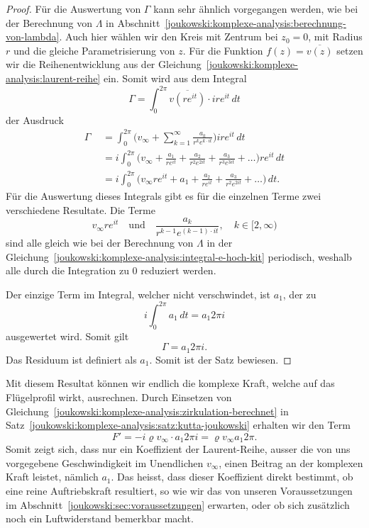 \begin{proof}
	\label{joukowski:komplexe-analysis:proof:zirkulation}
	Für die Auswertung von $\Gamma$ kann sehr ähnlich vorgegangen werden, wie bei der Berechnung von $\Lambda$ in Abschnitt~\ref{joukowski:komplexe-analysis:berechnung-von-lambda}.
	Auch hier wählen wir den Kreis mit Zentrum bei $z_0 = 0$, mit Radius $r$ und die gleiche Parametrisierung von $z$.
	Für die Funktion $f(z) = \overline{v(z)}$ setzen wir die Reihenentwicklung aus der Gleichung~\eqref{joukowski:komplexe-analysis:laurent-reihe} ein.
	Somit wird aus dem Integral
	\[
		\Gamma
		=
		\int_{0}^{2\pi}
		\overline{v(r e^{i t})} \cdot i r e^{i t}
		\, dt
		\]
		der Ausdruck
	\[
	\begin{aligned}
		\Gamma
		&=
		\int_{0}^{2\pi}
		\biggl(v_\infty + \sum_{k=1}^{\infty} \frac{a_k}{r^k e^{k \cdot i t}}\biggr)
		i r e^{i t}
		\, dt \\
		\quad
		&=
		i\displaystyle\int_{0}^{2\pi}
		\biggl(v_\infty + \frac{a_1}{r e^{i t}} + \frac{a_2}{r^2 e^{2 i t}} + \frac{a_3}{r^3 e^{3 i t}} + \dots \biggr)
		r e^{i t}
		\, dt \\
		\quad
		&=
		i\displaystyle\int_{0}^{2\pi}
		\biggl(v_\infty r e^{i t} + a_1 + \frac{a_2}{r e^{i t}} + \frac{a_3}{r^2 e^{2 i t}} + \dots \biggr)
		\, dt.
	\end{aligned}
	\]
	Für die Auswertung dieses Integrals gibt es für die einzelnen Terme zwei verschiedene Resultate.
	Die Terme
	\[
		v_\infty r e^{i t}
		\quad
		\text{und}
		\quad
		\frac{a_k}{r^{k-1} e^{(k-1) \cdot i t}},
		\quad
		k \in [2, \infty)
	\]
	sind alle gleich wie bei der Berechnung von $\Lambda$ in der Gleichung~\eqref{joukowski:komplexe-analysis:integral-e-hoch-kit} periodisch,
	weshalb alle durch die Integration zu $0$ reduziert werden.
	
	Der einzige Term im Integral, welcher nicht verschwindet, ist $a_1$, der zu
	\[
		i\displaystyle\int_{0}^{2\pi}
		a_1
		\, dt
		=
		a_1 2\pi i
	\]
	ausgewertet wird.
	Somit gilt
	\begin{equation}
		\Gamma
		=
		a_1 2\pi i.
		\label{joukowski:komplexe-analysis:zirkulation-berechnet}
	\end{equation}
	Das Residuum ist definiert als $a_1$. Somit ist der Satz bewiesen.
\end{proof}
Mit diesem Resultat können wir endlich die komplexe Kraft, welche auf das Flügelprofil wirkt, ausrechnen.
Durch Einsetzen von Gleichung~\eqref{joukowski:komplexe-analysis:zirkulation-berechnet}
in Satz~\ref{joukowski:komplexe-analysis:satz:kutta-joukowski}
erhalten wir den Term
\begin{equation}
	F'
	=
	-i \varrho v_\infty \cdot a_1 2\pi i
	= \varrho v_\infty a_1 2 \pi.
	\label{joukowski:komplexe-analysis:auftriebskraft-berechnet}
\end{equation}
Somit zeigt sich, dass nur ein Koeffizient der Laurent-Reihe, 
ausser die von uns vorgegebene Geschwindigkeit im Unendlichen $v_\infty$, 
einen Beitrag an der komplexen Kraft leistet, nämlich $a_1$.
Das heisst, dass dieser Koeffizient direkt bestimmt, 
ob eine reine Auftriebskraft resultiert, so wie wir das von unseren Voraussetzungen im Abschnitt~\ref{joukowski:sec:voraussetzungen} erwarten,
oder ob sich zusätzlich noch ein Luftwiderstand bemerkbar macht.

